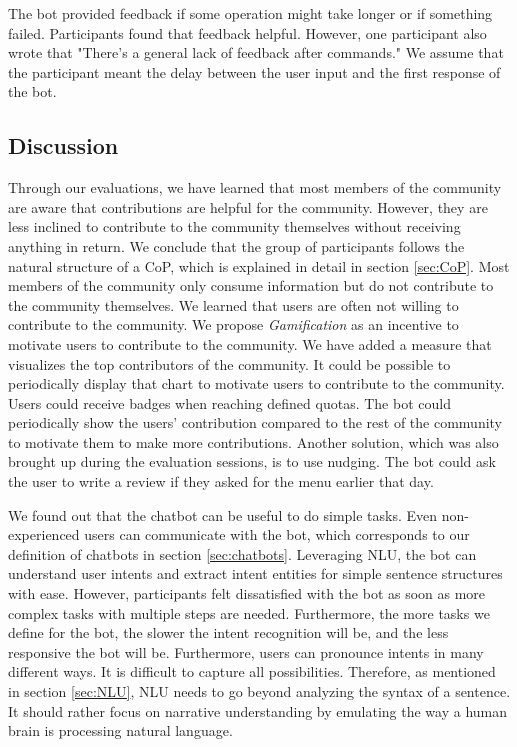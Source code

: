 The bot provided feedback if some operation might take longer or if something failed. Participants found that feedback helpful. However, one participant also wrote that "There's a general lack of feedback after commands." We assume that the participant meant the delay between the user input and the first response of the bot.  

\subsection{Discussion}
Through our evaluations, we have learned that most members of the community are aware that contributions are helpful for the community. However, they are less inclined to contribute to the community themselves without receiving anything in return. 
We conclude that the group of participants follows the natural structure of a CoP, which is explained in detail in section \ref{sec:CoP}. Most members of the community only consume information but do not contribute to the community themselves. We learned that users are often not willing to contribute to the community. We propose \emph{Gamification} as an incentive to motivate users to contribute to the community.
We have added a measure that visualizes the top contributors of the community. It could be possible to periodically display that chart to motivate users to contribute to the community.
Users could receive badges when reaching defined quotas. The bot could periodically show the users' contribution compared to the rest of the community to motivate them to make more contributions.
Another solution, which was also brought up during the evaluation sessions, is to use nudging. The bot could ask the user to write a review if they asked for the menu earlier that day.

We found out that the chatbot can be useful to do simple tasks. Even non-experienced users can communicate with the bot, which corresponds to our definition of chatbots in section \ref{sec:chatbots}. Leveraging NLU, the bot can understand user intents and extract intent entities for simple sentence structures with ease. However,  participants felt dissatisfied with the bot as soon as more complex tasks with multiple steps are needed. Furthermore, the more tasks we define for the bot, the slower the intent recognition will be, and the less responsive the bot will be. 
Furthermore, users can pronounce intents in many different ways. It is difficult to capture all possibilities.
Therefore, as mentioned in section \ref{sec:NLU}, NLU needs to go beyond analyzing the syntax of a sentence. It should rather focus on narrative understanding by emulating the way a human brain is processing natural language. \cite{CaWh14}